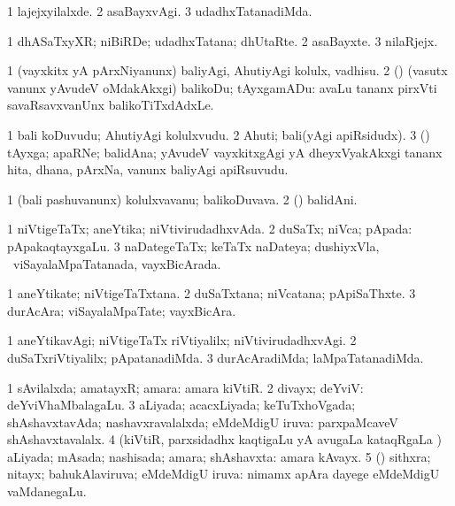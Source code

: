 \bentry
{}
\gl{\kirxvi}
\bmng
\bnum
\num{1} lajejxyilalxde. 
\num{2} asaBayxvAgi. 
\num{3} udadhxTatanadiMda. 
\enum
\emng
\eentry

\bentry
{}
\gl{\nA}
\bmng
\bnum
\num{1} dhASaTxyXR; niBiRDe; udadhxTatana; dhUtaRte. 
\num{2} asaBayxte. 
\num{3} nilaRjejx. 
\enum
\emng
\eentry

\bentry
{}
\gl{\sakirx}
\bmng
\bnum
\num{1} (vayxkitx yA pArxNiyanunx) baliyAgi, AhutiyAgi kolulx, vadhisu. 
\num{2} (\rUpa) (vasutx \mo vanunx yAvudeV oMdakAkxgi) balikoDu; tAyxgamADu:  avaLu tananx pirxVti savaRsavxvanUnx balikoTiTxdAdxLe. 
\enum
\emng
\eentry

\bentry
{}
\gl{\nA}
\bmng
\bnum
\num{1} bali koDuvudu; AhutiyAgi kolulxvudu. 
\num{2} Ahuti; bali(yAgi apiRsidudx). 
\num{3} (\rUpa) tAyxga; apaRNe; balidAna; yAvudeV vayxkitxgAgi yA dheyxVyakAkxgi tananx hita, dhana, pArxNa, \mo vanunx baliyAgi apiRsuvudu. 
\enum
\emng
\eentry

\bentry
{}
\gl{\nA}
\bmng
\bnum
\num{1} (bali pashuvanunx) kolulxvavanu; balikoDuvava. 
\num{2} (\rUpa) balidAni. 
\enum
\emng
\eentry

\bentry
{}
\gl{\gu}
\bmng
\bnum
\num{1} niVtigeTaTx; aneYtika; niVtivirudadhxvAda. 
\num{2} duSaTx; niVca; pApada:  pApakaqtayxgaLu. 
\num{3} naDategeTaTx; keTaTx naDateya; dushiyxVla, \kanmu\ viSayalaMpaTatanada, vayxBicArada. 
\enum
\emng
\eentry

\bentry
{}
\gl{\nA}
\bmng
\bnum
\num{1} aneYtikate; niVtigeTaTxtana. 
\num{2} duSaTxtana; niVcatana; pApiSaThxte. 
\num{3} durAcAra; viSayalaMpaTate; vayxBicAra. 
\enum
\emng
\eentry

\bentry
{}
\gl{\kirxvi}
\bmng
\bnum
\num{1} aneYtikavAgi; niVtigeTaTx riVtiyalilx; niVtivirudadhxvAgi. 
\num{2} duSaTxriVtiyalilx; pApatanadiMda. 
\num{3} durAcAradiMda; laMpaTatanadiMda. 
\enum
\emng
\eentry

\bentry
{}
\gl{\gu}
\bmng
\bnum
\num{1} sAvilalxda; amatayxR; amara:  amara kiVtiR. 
\num{2} divayx; deYviV:  deYviVhaMbalagaLu. 
\num{3} aLiyada; acacxLiyada; keTuTxhoVgada; shAshavxtavAda; nashavxravalalxda; eMdeMdigU iruva:  parxpaMcaveV shAshavxtavalalx. 
\num{4} (kiVtiR, parxsidadhx kaqtigaLu yA avugaLa kataqRgaLa \vi) aLiyada; mAsada; nashisada; amara; shAshavxta:  amara kAvayx. 
\num{5} (\AmA) sithxra; nitayx; bahukAlaviruva; eMdeMdigU iruva:  nimamx apAra dayege eMdeMdigU vaMdanegaLu. 
\enum
\emng
\eentry

